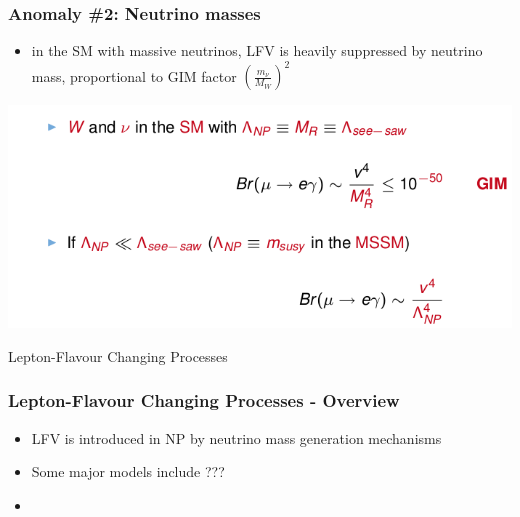 \documentclass[xcolor=table]{beamer}
\begin{document}
\begin{frame}
\frametitle{Anomaly \#2: Neutrino masses}

\begin{itemize}
\item in the SM with massive neutrinos, LFV is heavily suppressed by neutrino mass, proportional to GIM factor $\left(\frac{m_{\nu}}{M_W}\right)^2$
\end{itemize}

\begin{center}
\includegraphics[width=\textwidth]{images/paradisi-mssm-br.png}
\end{center}


\end{frame}






\begin{frame}

\begin{center}
{\Huge Lepton-Flavour Changing Processes}
\end{center}

\end{frame}



\begin{frame}
\frametitle{Lepton-Flavour Changing Processes - Overview}

\begin{itemize}
\item LFV is introduced in NP by neutrino mass generation mechanisms
\item Some major models include ??? 
\item 
\end{itemize}

\end{frame}


\end{document}
